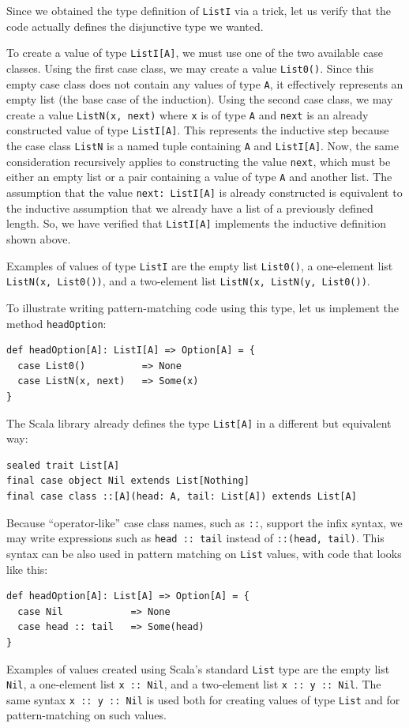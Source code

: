 Since we obtained the type definition of \lstinline!ListI! via a
trick, let us verify that the code actually defines the disjunctive
type we wanted. 

To create a value of type \lstinline!ListI[A]!, we must use one of
the two available case classes. Using the first case class, we may
create a value \lstinline!List0()!. Since this empty case class does
not contain any values of type \lstinline!A!, it effectively represents
an empty list (the base case of the induction). Using the second case
class, we may create a value \lstinline!ListN(x, next)! where \lstinline!x!
is of type \lstinline!A! and \lstinline!next! is an already constructed
value of type \lstinline!ListI[A]!. This represents the inductive
step because the case class \lstinline!ListN! is a named tuple containing
\lstinline!A! and \lstinline!ListI[A]!. Now, the same consideration
recursively applies to constructing the value \lstinline!next!, which
must be either an empty list or a pair containing a value of type
\lstinline!A! and another list. The assumption that the value \lstinline!next: ListI[A]!
is already constructed is equivalent to the inductive assumption that
we already have a list of a previously defined length. So, we have
verified that \lstinline!ListI[A]! implements the inductive definition
shown above.

Examples of values of type \lstinline!ListI! are the empty list \lstinline!List0()!,
a one-element list \lstinline!ListN(x, List0())!, and a two-element
list \lstinline!ListN(x, ListN(y, List0())!.

To illustrate writing pattern-matching code using this type, let us
implement the method \lstinline!headOption!:
\begin{lstlisting}
def headOption[A]: ListI[A] => Option[A] = {
  case List0()          => None
  case ListN(x, next)   => Some(x)
}
\end{lstlisting}

The Scala library already defines the type \lstinline!List[A]! in
a different but equivalent way:
\begin{lstlisting}
sealed trait List[A]
final case object Nil extends List[Nothing]
final case class ::[A](head: A, tail: List[A]) extends List[A]
\end{lstlisting}
Because ``operator-like'' case class names, such as \lstinline!::!,
support the infix syntax, we may write expressions such as \lstinline!head :: tail!
instead of \lstinline!::(head, tail)!. This syntax can be also used
in pattern matching on \lstinline!List! values, with code that looks
like this:
\begin{lstlisting}
def headOption[A]: List[A] => Option[A] = {
  case Nil            => None
  case head :: tail   => Some(head)
}
\end{lstlisting}
Examples of values created using Scala's standard \lstinline!List!
type are the empty list \lstinline!Nil!, a one-element list \lstinline!x :: Nil!,
and a two-element list \lstinline!x :: y :: Nil!. The same syntax
\lstinline!x :: y :: Nil! is used both for creating values of type
\lstinline!List! and for pattern-matching on such values. 

